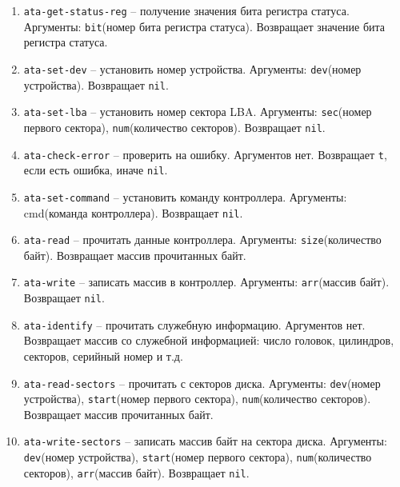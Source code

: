 \begin{enumerate}
	\item \texttt{ata-get-status-reg} -- получение значения бита регистра статуса. Аргументы: \texttt{bit}(номер бита регистра статуса). Возвращает значение бита регистра статуса.
	\item \texttt{ata-set-dev} -- установить номер устройства. Аргументы: \texttt{dev}(номер устройства). Возвращает \texttt{nil}.
	\item \texttt{ata-set-lba} -- установить номер сектора LBA. Аргументы: \texttt{sec}(номер первого сектора), \texttt{num}(количество секторов). Возвращает \texttt{nil}.
	\item \texttt{ata-check-error} -- проверить на ошибку. Аргументов нет. Возвращает \texttt{t}, если есть ошибка, иначе \texttt{nil}.
	\item \texttt{ata-set-command} -- установить команду контроллера. Аргументы: cmd(команда контроллера). Возвращает \texttt{nil}.
	\item \texttt{ata-read} -- прочитать данные контроллера. Аргументы: \texttt{size}(количество байт). Возвращает массив прочитанных байт.
	\item \texttt{ata-write} -- записать массив в контроллер. Аргументы: \texttt{arr}(массив байт). Возвращает \texttt{nil}.
	\item \texttt{ata-identify} -- прочитать служебную информацию. Аргументов нет. Возвращает массив со служебной информацией: число головок, цилиндров, секторов, серийный номер и т.д.
	\item \texttt{ata-read-sectors} -- прочитать с секторов диска. Аргументы: \texttt{dev}(номер устройства), \texttt{start}(номер первого сектора), \texttt{num}(количество секторов). Возвращает массив прочитанных байт.
	\item \texttt{ata-write-sectors} -- записать массив байт на сектора диска. Аргументы: \texttt{dev}(номер устройства), \texttt{start}(номер первого сектора), \texttt{num}(количество секторов), \texttt{arr}(массив байт). Возвращает \texttt{nil}.
\end{enumerate}